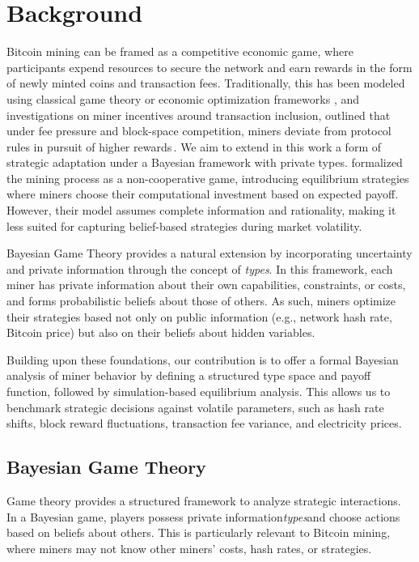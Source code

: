 \documentclass[12pt]{article}
\begin{document}

\section{Background}
Bitcoin mining can be framed as a competitive economic game, where participants expend resources to secure the network and earn rewards in the form of newly minted coins and transaction fees. Traditionally, this has been modeled using classical game theory or economic optimization frameworks \cite{kiayias2016blockchain}, and investigations on miner incentives around transaction inclusion, outlined that under fee pressure and block-space competition, miners deviate from protocol rules in pursuit of higher rewards\,\cite{lewenberg2015inclusive}. We aim to extend in this work a form of strategic adaptation under a Bayesian framework with private types. \citeauthor{kiayias2016blockchain} formalized the mining process as a non-cooperative game, introducing equilibrium strategies where miners choose their computational investment based on expected payoff. However, their model assumes complete information and rationality, making it less suited for capturing belief-based strategies during market volatility.

Bayesian Game Theory provides a natural extension by incorporating uncertainty and private information through the concept of \emph{types}. In this framework, each miner has private information about their own capabilities, constraints, or costs, and forms probabilistic beliefs about those of others. As such, miners optimize their strategies based not only on public information (e.g., network hash rate, Bitcoin price) but also on their beliefs about hidden variables.

Building upon these foundations, our contribution is to offer a formal Bayesian analysis of miner behavior by defining a structured type space and payoff function, followed by simulation-based equilibrium analysis. This allows us to benchmark strategic decisions against volatile parameters, such as hash rate shifts, block reward fluctuations, transaction fee variance, and electricity prices.

\subsection{Bayesian Game Theory}
Game theory provides a structured framework to analyze strategic interactions. In a Bayesian game, players possess private information\textemdash\emph{types}\textemdash and choose actions based on beliefs about others. This is particularly relevant to Bitcoin mining, where miners may not know other miners' costs, hash rates, or strategies.
\end{document}
